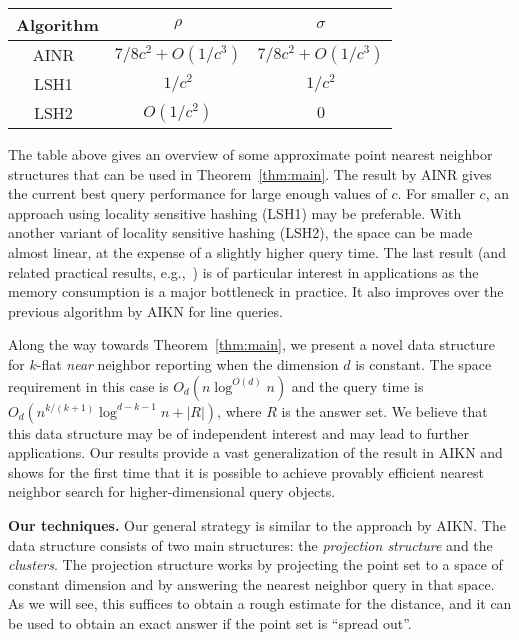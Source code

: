 \documentclass[a4paper,11pt]{paper}
\begin{document}
\begin{center}
\begin{tabular}{|c|c|c|}
  \hline
  Algorithm & $\rho$ & $\sigma$\\
  \hline
  AINR~\cite{AndoniInNgRa14} & $7/8c^2 + O(1/c^3)$&
  $7/8c^2 + O(1/c^3)$ \\
  LSH1~\cite[Theorem~3.2.1]{Andoni09} & $1/c^2$ & $1/c^2$\\
  LSH2~\cite[Theorem~3.4.1]{Andoni09} & $O(1/c^2)$ & $0$\\
  \hline
\end{tabular}
\end{center}
The table above gives an overview of
some approximate point nearest neighbor structures
that can be used in Theorem~\ref{thm:main}.
The result by AINR gives the current best query performance for large
enough values of $c$. For smaller $c$, an approach
using locality sensitive hashing (LSH1) may be preferable.
With another variant of locality sensitive hashing (LSH2),
the space can be made almost linear, at the expense of a slightly
higher query time. The last result (and related practical
results, e.g.,~\cite{LvJoWaChLi07}) is of particular
interest in applications as the memory consumption is a major bottleneck in practice. It also improves
over the previous algorithm by AIKN for line queries.

Along the way towards Theorem~\ref{thm:main},
we present a novel data structure for
$k$-flat \emph{near} neighbor reporting when the dimension $d$ is
constant. The space requirement in this case is
$O_d(n \log^{O(d)} n)$ and the query time is
$O_d(n^{k/(k+1)}\log^{d-k-1} n + |R|)$, where $R$ is the answer set.
We believe that this data structure may be of independent
interest and may lead to further applications.
Our results provide a vast generalization of the result in  AIKN
and shows for the first time
that it is possible to achieve provably efficient
nearest neighbor search for higher-dimensional query objects.


\noindent
\textbf{Our techniques.}
Our general strategy is similar to the approach by AIKN.
The data structure  consists of two  main structures: the
\emph{projection structure} and the \emph{clusters}.
The projection structure works by projecting the point set
to a space of constant dimension and by answering the nearest
neighbor query in that space. As we will see, this suffices
to obtain a rough estimate for the distance, and it can be
used to obtain an exact answer if the point set is ``spread
out''.
\end{document}
